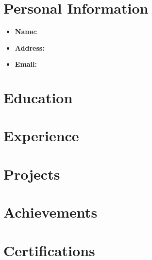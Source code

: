 \documentclass[a4paper,10pt]{article}
\begin{document}
\section*{Personal Information}
\begin{itemize}
    \item \textbf{Name:} 
    \item \textbf{Address:} 
    \item \textbf{Email:} \href{mailto:\VAR{personal_information.email}}{}
\end{itemize}

\section{Education}
  \resumeSubHeadingListStart
    \resumeSubheading
      {}{}
      {}{}
  \resumeSubHeadingListEnd

\section*{Experience}
\begin{itemize}
\end{itemize}

\section*{Projects}
\begin{itemize}
\end{itemize}

\section*{Achievements}
\begin{itemize}
\end{itemize}

\section*{Certifications}
\begin{itemize}
\end{itemize}
\end{document}
